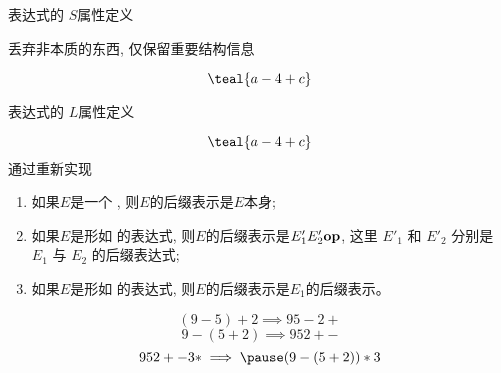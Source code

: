 \begin{frame}{}
  \begin{center}
    表达式的 $S$属性定义

  \end{center}
\end{frame}

\begin{frame}{}
  \begin{center}
     丢弃非本质的东西, 仅保留重要结构信息

    \vspace{-0.50cm}
    \[
      \teal{a - 4 + c}
    \]
  \end{center}
\end{frame}

\begin{frame}{}
  \begin{center}
    表达式的 $L$属性定义

  \end{center}
\end{frame}

\begin{frame}{}
  \begin{center}
    \[
      \teal{a - 4 + c}
    \]
    \pause
    通过重新实现
  \end{center}
\end{frame}

\begin{frame}{}
  \begin{definition}
    \begin{enumerate}[(1)]
      \setlength{\itemsep}{8pt}
      \item 如果$E$是一个 , 则$E$的后缀表示是$E$本身;
      \item 如果$E$是形如  的表达式,
        则$E$的后缀表示是$E'_{1} E'_{2} \text{\bf op}$,
        这里 $E'_{1}$ 和 $E'_{2}$ 分别是 $E_{1}$ 与 $E_{2}$ 的后缀表达式;
      \item 如果$E$是形如  的表达式, 则$E$的后缀表示是$E_{1}$的后缀表示。
    \end{enumerate}
  \end{definition}

  \pause
  \begin{center}
    \[
      (9-5)+2 \implies 95-2+
    \]
    \[
      9-(5+2) \implies 952+-
    \]
    \pause
    \[
      952+-3\ast \implies\pause (9-(5+2)) \ast 3
    \]
  \end{center}
\end{frame}

